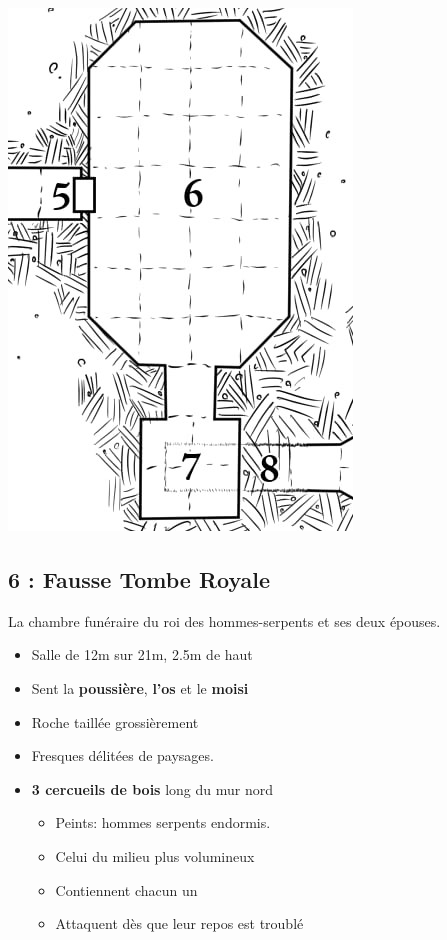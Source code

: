 \begin{center}
  \includegraphics[width=\columnwidth]{pics/map_5-8.jpg}
\end{center}
\subsection{6 : Fausse Tombe Royale}\label{n1:s6}
La chambre funéraire du roi des hommes-serpents et ses deux épouses.
\begin{itemize}
  \item Salle de 12m sur 21m, 2.5m de haut
  \item Sent la \textbf{poussière}, \textbf{l'os} et le \textbf{moisi}
  \item Roche taillée grossièrement
  \item Fresques délitées de paysages.
  \item \textbf{3 cercueils de bois} long du mur nord
  \begin{itemize}
    \item Peints: hommes serpents endormis.
    \item Celui du milieu plus volumineux
    \item Contiennent chacun un \textbf{}
    \item Attaquent dès que leur repos est troublé
  \end{itemize}
\end{itemize}



